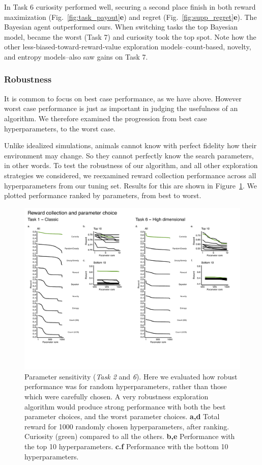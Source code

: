 In Task 6 curiosity performed well, securing a second place finish in both reward maximization (Fig.~\ref{fig:task_payout}\textbf{e}) and regret (Fig.~\ref{fig:supp_regret}\textbf{e}). The Bayesian agent outperformed ours. When switching tasks the top Bayesian model, became the worst (Task 7) and curiosity took the top spot. Note how the other less-biased-toward-reward-value exploration models--count-based, novelty, and entropy models--also saw gains on Task 7.


\subsubsection*{Robustness}
It is common to focus on best case performance, as we have above. However worst case performance is just as important in judging the usefulness of an algorithm. We therefore examined the progression from best case hyperparameters, to the worst case.  

Unlike idealized simulations, animals cannot know with perfect fidelity how their environment may change. So they cannot perfectly know the search parameters, in other words. To test the robustness of our algorithm, and all other exploration strategies we considered, we reexamined reward collection performance across all hyperparameters from our tuning set. Results for this are shown in Figure~\ref{fig:robust}. We plotted performance ranked by parameters, from best to worst.

\begin{figure}
	\includegraphics[width=11.4cm]{img/robust.pdf} 
	\caption{Parameter sensitivity (\textit{Task 2} and \textit{6}). Here we evaluated how robust performance was for random hyperparameters, rather than those which were carefully chosen. A very robustness exploration algorithm would produce strong performance with both the best parameter choices, and the worst parameter choices. 
	\textbf{a,d} Total reward for 1000 randomly chosen hyperparameters, after ranking. Curiosity (green) compared to all the others.
	\textbf{b,e} Performance with the top 10 hyperparameters.
	\textbf{c.f} Performance with the bottom 10 hyperparameters.
	}
	\label{fig:robust}
\end{figure}


